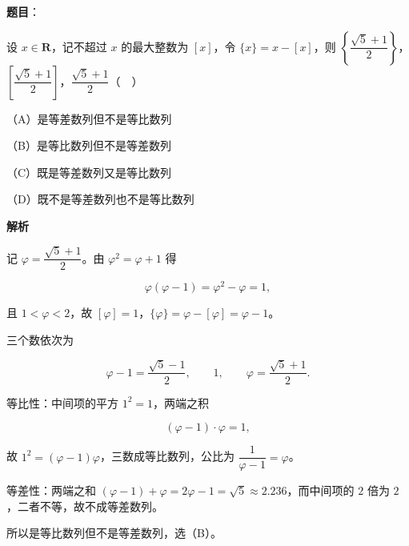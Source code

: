 \begin{answer}

\textbf{题目}：

设 $x\in\mathbf R$，记不超过 $x$ 的最大整数为 $[x]$，令 $\{x\}=x-[x]$，则 $\left\{\dfrac{\sqrt5+1}{2}\right\}$，$\left[\dfrac{\sqrt5+1}{2}\right]$，$\dfrac{\sqrt5+1}{2}$（　）

（A）是等差数列但不是等比数列

（B）是等比数列但不是等差数列

（C）既是等差数列又是等比数列

（D）既不是等差数列也不是等比数列

\textbf{解析}

记 $\varphi=\dfrac{\sqrt5+1}{2}$。由 $\varphi^2=\varphi+1$ 得

\nopagebreak[4]
\[\varphi(\varphi-1)=\varphi^2-\varphi=1,\]

且 $1<\varphi<2$，故 $[\varphi]=1$，$\{\varphi\}=\varphi-[\varphi]=\varphi-1$。

三个数依次为

\nopagebreak[4]
\[\varphi-1=\frac{\sqrt5-1}{2},\qquad 1,\qquad \varphi=\frac{\sqrt5+1}{2}.\]

等比性：中间项的平方 $1^2=1$，两端之积

\nopagebreak[4]
\[(\varphi-1)\cdot\varphi=1,\]

故 $1^2=(\varphi-1)\varphi$，三数成等比数列，公比为 $\dfrac{1}{\varphi-1}=\varphi$。

等差性：两端之和 $(\varphi-1)+\varphi=2\varphi-1=\sqrt5\approx2.236$，而中间项的 $2$ 倍为 $2$，二者不等，故不成等差数列。

所以是等比数列但不是等差数列，选（B）。


\end{answer}
